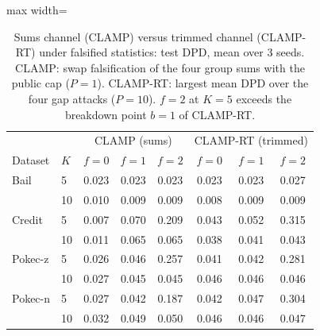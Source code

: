 \begin{table}[tbp]
\centering
\footnotesize
\setlength{\tabcolsep}{4pt}
\caption{Sums channel (CLAMP) versus trimmed channel (CLAMP-RT) under falsified statistics: test DPD, mean over 3 seeds. CLAMP: swap falsification of the four group sums with the public cap ($P=1$). CLAMP-RT: largest mean DPD over the four gap attacks ($P=10$). $f=2$ at $K=5$ exceeds the breakdown point $b=1$ of CLAMP-RT.}
\label{tab:oldnew}
\begin{adjustbox}{max width=\textwidth}
\begin{tabular}{llccc|ccc}
\toprule
 & & \multicolumn{3}{c|}{CLAMP (sums)} & \multicolumn{3}{c}{CLAMP-RT (trimmed)} \\
Dataset & $K$ & $f=0$ & $f=1$ & $f=2$ & $f=0$ & $f=1$ & $f=2$ \\
\midrule
Bail & 5 & 0.023 & 0.023 & 0.023 & 0.023 & 0.023 & 0.027 \\
 & 10 & 0.010 & 0.009 & 0.009 & 0.008 & 0.009 & 0.009 \\
Credit & 5 & 0.007 & 0.070 & 0.209 & 0.043 & 0.052 & 0.315 \\
 & 10 & 0.011 & 0.065 & 0.065 & 0.038 & 0.041 & 0.043 \\
Pokec-z & 5 & 0.026 & 0.046 & 0.257 & 0.041 & 0.042 & 0.281 \\
 & 10 & 0.027 & 0.045 & 0.045 & 0.046 & 0.046 & 0.046 \\
Pokec-n & 5 & 0.027 & 0.042 & 0.187 & 0.042 & 0.047 & 0.304 \\
 & 10 & 0.032 & 0.049 & 0.050 & 0.046 & 0.046 & 0.047 \\
\bottomrule
\end{tabular}
\end{adjustbox}
\end{table}
